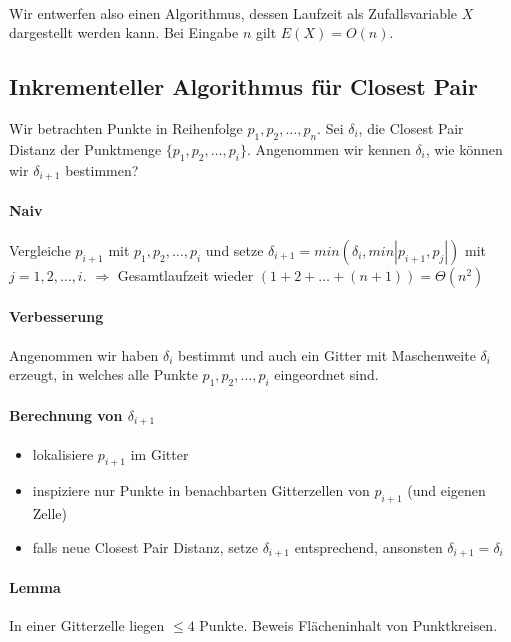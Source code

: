 \paragraph*{} Wir entwerfen also einen Algorithmus, dessen Laufzeit als Zufallsvariable $X$ dargestellt werden kann. Bei Eingabe $n$ gilt $E(X) = O(n)$.


\subsection{Inkrementeller Algorithmus für Closest Pair}
Wir betrachten Punkte in Reihenfolge $p_1,p_2,\dots,p_n$. Sei $\delta_i$, die Closest Pair Distanz der Punktmenge $\{ p_1,p_2,\dots,p_i \}$. Angenommen wir kennen $\delta_i$, wie können wir $\delta_{i+1}$ bestimmen?

\paragraph*{Naiv} Vergleiche $p_{i+1}$ mit $p_1,p_2,\dots,p_i$ und setze $\delta_{i+1} = min(\delta_i, min|p_{i+1},p_j|)$ mit $j = 1,2,\dots,i$. $\Rightarrow$ Gesamtlaufzeit wieder $(1+2+\dots+(n+1)) = \Theta(n^2)$

\paragraph*{Verbesserung} Angenommen wir haben $\delta_i$ bestimmt und auch ein Gitter mit Maschenweite $\delta_i$ erzeugt, in welches alle Punkte $p_1,p_2,\dots,p_i$ eingeordnet sind.

\paragraph*{Berechnung von $\delta_{i+1}$}
\begin{itemize}
	\item lokalisiere $p_{i+1}$ im Gitter
	\item inspiziere nur Punkte in benachbarten Gitterzellen von $p_{i+1}$ (und eigenen Zelle)
	\item falls neue Closest Pair Distanz, setze $\delta_{i+1}$ entsprechend, ansonsten $\delta_{i+1} = \delta_i$
\end{itemize}

\paragraph*{Lemma} In einer Gitterzelle liegen $\leq 4$ Punkte. Beweis Flächeninhalt von Punktkreisen.

